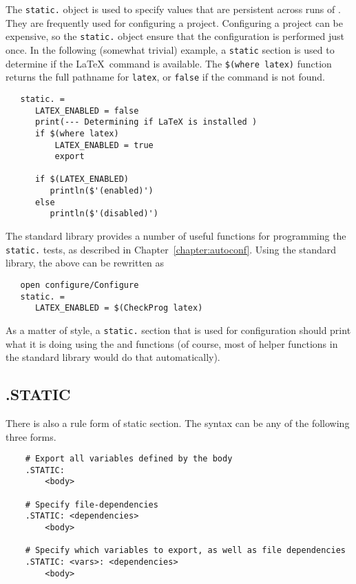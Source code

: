 The \verb+static.+ object is used to specify values that are persistent across runs of \OMake{}.  They
are frequently used for configuring a project.  Configuring a project can be expensive, so the
\verb+static.+ object ensure that the configuration is performed just once.  In the following
(somewhat trivial) example, a \verb+static+ section is used to determine if the \LaTeX\ command is
available.  The \verb+$(where latex)+ function returns the full pathname for \verb+latex+, or
\verb+false+ if the command is not found.

\begin{verbatim}
   static. =
      LATEX_ENABLED = false
      print(--- Determining if LaTeX is installed )
      if $(where latex)
          LATEX_ENABLED = true
          export

      if $(LATEX_ENABLED)
         println($'(enabled)')
      else
         println($'(disabled)')
\end{verbatim}

The \OMake standard library provides a number of useful functions for
programming the \verb+static.+ tests, as described in
Chapter~\ref{chapter:autoconf}. Using the standard library, the above can
be rewritten as

\begin{verbatim}
   open configure/Configure
   static. =
      LATEX_ENABLED = $(CheckProg latex)
\end{verbatim}

As a matter of style, a \verb+static.+ section that is used for configuration should print what it
is doing using the  and
 functions (of course, most of helper functions in
the standard library would do that automatically).

\subsection{.STATIC}
\label{section:.STATIC}

\newinreorg

There is also a rule form of static section.  The syntax can be any of the following three forms.

\begin{verbatim}
    # Export all variables defined by the body
    .STATIC:
        <body>

    # Specify file-dependencies
    .STATIC: <dependencies>
        <body>

    # Specify which variables to export, as well as file dependencies
    .STATIC: <vars>: <dependencies>
        <body>
\end{verbatim}


